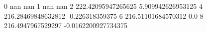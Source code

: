 0 nan nan
1 nan nan
2 222.42095947265625 5.909942626953125
4 216.28469848632812 -0.226318359375
6 216.51101684570312 0.0
8 216.4947967529297 -0.0162200927734375
